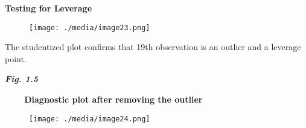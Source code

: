 \documentclass[12pt]{article}
\begin{document}
\vspace{\baselineskip}
\begin{justify}
\textbf{Testing for Leverage }
\end{justify}\par


\vspace{\baselineskip}



\begin{figure}[H]
	\begin{Center}
		\texttt{[image: ./media/image23.png]}
	\end{Center}
\end{figure}



\par

\begin{justify}
The studentized plot confirms that 19th observation is an outlier and a leverage point.
\end{justify}\par

\begin{justify}
{\fontsize{10pt}{12.0pt}\selectfont \textbf{\textit{Fig. 1.5}}\par}
\end{justify}\par

\begin{adjustwidth}{1.5in}{0.0in}
\begin{justify}
\textbf{\ \ \ \  Diagnostic plot after removing the outlier}
\end{justify}\par

\end{adjustwidth}




\begin{figure}[H]
	\begin{Center}
		\texttt{[image: ./media/image24.png]}
	\end{Center}
\end{figure}


\end{document}
